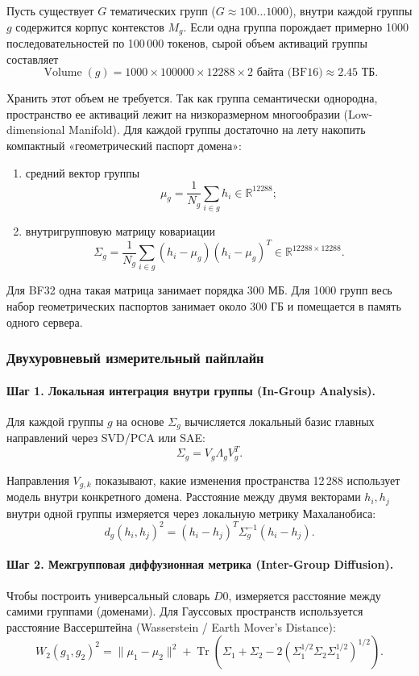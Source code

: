 \documentclass[11pt,a4paper]{article}
\begin{document}
Пусть существует $G$ тематических групп ($G\approx100\ldots1000$), внутри каждой группы $g$ содержится корпус контекстов $M_g$. Если одна группа порождает примерно 1000 последовательностей по 100\,000 токенов, сырой объем активаций группы составляет
\[
\operatorname{Volume}(g)
=1000\times100000\times12288\times2\text{ байта (BF16)}
\approx2.45\text{ ТБ}.
\]

Хранить этот объем не требуется. Так как группа семантически однородна, пространство ее активаций лежит на низкоразмерном многообразии (Low-dimensional Manifold). Для каждой группы достаточно на лету накопить компактный «геометрический паспорт домена»:

\begin{enumerate}
    \item средний вектор группы
    \[
    \mu_g=\frac{1}{N_g}\sum_{i\in g}h_i\in\mathbb{R}^{12288};
    \]
    \item внутригрупповую матрицу ковариации
    \[
    \Sigma_g
    =\frac{1}{N_g}\sum_{i\in g}(h_i-\mu_g)(h_i-\mu_g)^T
    \in\mathbb{R}^{12288\times12288}.
    \]
\end{enumerate}

Для BF32 одна такая матрица занимает порядка 300 МБ. Для 1000 групп весь набор геометрических паспортов занимает около 300 ГБ и помещается в память одного сервера.

\subsubsection*{Двухуровневый измерительный пайплайн}

\paragraph{Шаг 1. Локальная интеграция внутри группы (In-Group Analysis).}
Для каждой группы $g$ на основе $\Sigma_g$ вычисляется локальный базис главных направлений через SVD/PCA или SAE:
\[
\Sigma_g=V_g\Lambda_gV_g^T.
\]

Направления $V_{g,k}$ показывают, какие изменения пространства 12\,288 использует модель внутри конкретного домена. Расстояние между двумя векторами $h_i,h_j$ внутри одной группы измеряется через локальную метрику Махаланобиса:
\[
d_g(h_i,h_j)^2=(h_i-h_j)^T\Sigma_g^{-1}(h_i-h_j).
\]

\paragraph{Шаг 2. Межгрупповая диффузионная метрика (Inter-Group Diffusion).}
Чтобы построить универсальный словарь $D0$, измеряется расстояние между самими группами (доменами). Для Гауссовых пространств используется расстояние Вассерштейна (Wasserstein / Earth Mover's Distance):
\[
W_2(g_1,g_2)^2
=\|\mu_1-\mu_2\|^2
+\operatorname{Tr}\!\left(
\Sigma_1+\Sigma_2
-2\left(\Sigma_1^{1/2}\Sigma_2\Sigma_1^{1/2}\right)^{1/2}
\right).
\]
\end{document}
